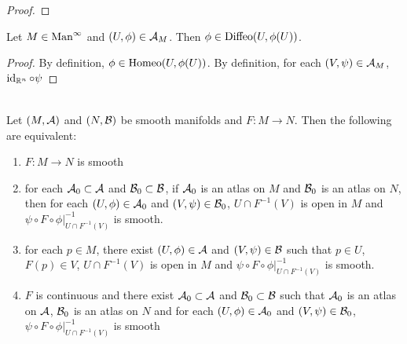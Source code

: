 \documentclass{book}
\begin{document}
\begin{proof}
\end{proof}

\begin{ex}
	Let $M \in \text{Man}^{\infty}$ and $(U, \phi) \in \mathcal{A}_M$. Then $\phi \in \operatorname{\text{Diffeo}}(U, \phi(U))$. 
\end{ex}

\begin{proof}
	By definition, $\phi \in \operatorname{\text{Homeo}}(U, \phi(U))$. By definition, for each $(V, \psi) \in \mathcal{A}_M$, $\operatorname{id}_{\mathbb{R}^n} \circ \psi$ 
\end{proof}

\begin{ex}   \\
	Let $(M, \mathcal{A})$ and $(N, \mathcal{B})$ be smooth manifolds and $F: M \rightarrow N$. Then the following are equivalent:
	\begin{enumerate}
		\item $F:M \rightarrow N$ is smooth
		\item for each $\mathcal{A}_0 \subset \mathcal{A}$ and $\mathcal{B}_0 \subset \mathcal{B}$, if $\mathcal{A}_0$ is an atlas on $M$ and $\mathcal{B}_0$ is an atlas on $N$, then for each $(U, \phi) \in \mathcal{A}_0$ and $(V, \psi) \in \mathcal{B}_0$, $U \cap F^{-1}(V)$ is open in $M$ and $\psi \circ F \circ \phi|_{U \cap F^{-1}(V)}^{-1}$ is smooth.
		\item for each $p \in M$, there exist $(U, \phi) \in \mathcal{A}$ and $(V, \psi) \in \mathcal{B}$ such that $p \in U$, $F(p) \in V$, $U \cap F^{-1}(V)$ is open in $M$ and $\psi \circ F \circ \phi|_{U \cap F^{-1}(V)}^{-1}$ is smooth. 
		\item $F$ is continuous and there exist $\mathcal{A}_0 \subset \mathcal{A}$ and $\mathcal{B}_0 \subset \mathcal{B}$ such that $\mathcal{A}_0$ is an atlas on $\mathcal{A}$, $\mathcal{B}_0$ is an atlas on $N$ and for each $(U, \phi) \in \mathcal{A}_0$ and $(V, \psi) \in \mathcal{B}_0$, $\psi \circ F \circ \phi|_{U \cap F^{-1}(V)}^{-1}$ is smooth 
	\end{enumerate}
\end{ex}
\end{document}
